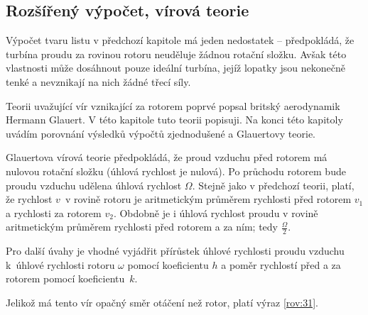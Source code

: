 	
	\subsection{Rozšířený výpočet, vírová teorie}\label{kap:funkce2}
	
	Výpočet tvaru listu v předchozí kapitole má jeden nedostatek – předpokládá, že turbína proudu za rovinou rotoru neuděluje žádnou rotační složku. Avšak této vlastnosti může dosáhnout pouze ideální turbína, jejíž lopatky jsou nekonečně tenké a nevznikají na nich žádné třecí síly.
	
	Teorii uvažující vír vznikající za rotorem poprvé popsal britský aerodynamik Hermann Glauert. V této kapitole tuto teorii popisuji. Na konci této kapitoly uvádím porovnání výsledků výpočtů zjednodušené a Glauertovy teorie.
	
	Glauertova vírová teorie předpokládá, že proud vzduchu před rotorem má nulovou rotační složku (úhlová rychlost je nulová). Po průchodu rotorem bude proudu vzduchu udělena úhlová rychlost $\Omega$. Stejně jako v předchozí teorii, platí, že rychlost $v$~v rovině rotoru je aritmetickým průměrem rychlosti před rotorem $v_1$ a rychlosti za rotorem     $v_2$. Obdobně je i úhlová rychlost proudu v rovině aritmetickým průměrem rychlosti před rotorem a za ním; tedy $\frac{\Omega}{2}$\cite{Rychetnik:Motory}.
	
	Pro další úvahy je vhodné vyjádřit přírůstek úhlové rychlosti proudu vzduchu k~úhlové rychlosti rotoru $\omega$ pomocí koeficientu $h$ a poměr rychlostí před a za rotorem pomocí koeficientu~$k$.
	
	Jelikož má tento vír opačný směr otáčení než rotor, platí výraz \eqref{rov:31}\cite{Rychetnik:Motory}.
	
